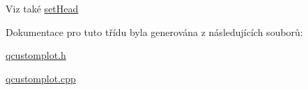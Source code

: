 \begin{DoxySeeAlso}{Viz také}
\hyperlink{classQCPItemCurve_a08a30d9cdd63995deea3d9e20430676f}{set\+Head} 
\end{DoxySeeAlso}


Dokumentace pro tuto třídu byla generována z následujících souborů\+:\begin{DoxyCompactItemize}
\item 
\hyperlink{qcustomplot_8h}{qcustomplot.\+h}\item 
\hyperlink{qcustomplot_8cpp}{qcustomplot.\+cpp}\end{DoxyCompactItemize}
